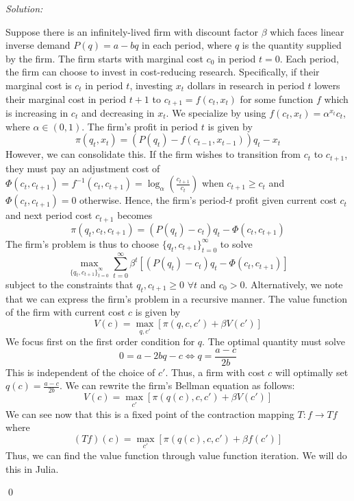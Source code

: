 \documentclass[12pt]{article}
\newenvironment{sol}
           {\emph{Solution:}
           }
           {
           \qed
           }
\begin{document}
       \begin{sol}
        Suppose there is an infinitely-lived firm with discount factor $\beta$ which faces linear inverse demand $P(q) = a - b q$ in each period, where $q$ is the quantity supplied by the firm. The firm starts with marginal cost $c_0$ in period $t=0$. Each period, the firm can choose to invest in cost-reducing research. Specifically, if their marginal cost is $c_t$ in period $t$, investing $x_t$ dollars in research in period $t$ lowers their marginal cost in period $t+1$ to $c_{t+1} = f(c_t, x_t)$ for some function $f$ which is increasing in $c_t$ and decreasing in $x_t$. We specialize by using $f(c_t, x_t) = \alpha^{x_t} c_t $, where $\alpha \in (0,1)$. The firm's profit in period $t$ is given by
        \[\pi(q_t, x_t) = (P(q_t) - f(c_{t-1}, x_{t-1}))q_t - x_t\]
        However, we can consolidate this. If the firm wishes to transition from $c_t$ to $c_{t+1}$, they must pay an adjustment cost of $\Phi(c_{t}, c_{t+1}) = f^{-1}(c_{t}, c_{t+1})= \log_{\alpha}\left(\frac{c_{t+1}}{c_t} \right)$ when $c_{t+1} \geq c_t$ and $\Phi(c_t, c_{t+1}) = 0$ otherwise. Hence, the firm's period-$t$ profit given current cost $c_t$ and next period cost $c_{t+1}$ becomes
        \[\pi(q_t, c_t, c_{t+1}) = (P(q_t) - c_t)q_t - \Phi(c_t, c_{t+1})\]
        The firm's problem is thus to choose $\{q_t, c_{t+1}\}_{t=0}^{\infty}$ to solve
        \[\max_{\{q_t, c_{t+1}\}_{t=0}^{\infty}} \sum_{t=0}^{\infty} \beta^t \left[(P(q_t) - c_t)q_t - \Phi(c_t, c_{t+1})\right]\]
        subject to the constraints that $q_t, c_{t+1} \geq 0$ $\forall t$ and $c_{0} > 0$.
        Alternatively, we note that we can express the firm's problem in a recursive manner. The value function of the firm with current cost $c$ is given by 
        \[V(c) = \max_{q, c'} \left[\pi(q, c, c') + \beta V(c')\right]\]
        We focus first on the first order condition for $q$. The optimal quantity must solve 
        \[0 = a - 2bq - c  \iff q = \frac{a -c}{2b}\]
        This is independent of the choice of $c'$. Thus, a firm with cost $c$ will optimally set $q(c) = \frac{a-c}{2b}$. We can rewrite the firm's Bellman equation as follows:
        \[V(c) = \max_{c'} \left[\pi(q(c), c, c') + \beta V(c')\right]\]
        We can see now that this is a fixed point of the contraction mapping $T: f \rightarrow Tf$ where
        \[(T f)(c) = \max_{c'} \left[ \pi(q(c), c, c') + \beta f(c') \right]\]
        Thus, we can find the value function through value function iteration. We will do this in Julia.
       \end{sol}
       
\end{document}

